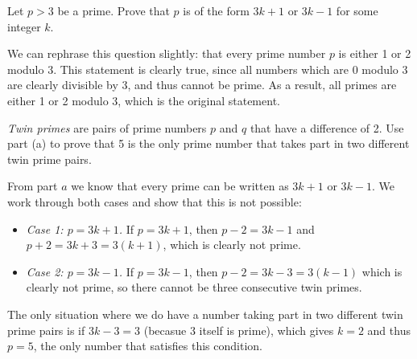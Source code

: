 \documentclass[11pt]{article}
\begin{document}

\begin{Parts}

\Part
Let $p > 3$ be a prime. Prove that $p$ is of the form $3k + 1$ or $3k-1$ for some integer $k$.

\begin{solution} 
    We can rephrase this question slightly: that every prime number $p$ is either 1 or 2 modulo 3. This statement is clearly true, since all numbers which are $0$ modulo 3 are clearly divisible by 3, and thus cannot be prime. As a result, all primes are either 1 or 2 modulo 3, which is the original statement.
\end{solution} 

\Part
\textit{Twin primes} are pairs of prime numbers $p$ and $q$ that have a difference of 2. Use part (a) to prove that 5 is the only prime number that takes part in two different twin prime pairs.

\begin{solution}
   From part $a$ we know that every prime can be written as $3k + 1$ or $3k - 1$. We work through both cases and show that this is not possible:

   \begin{itemize}
        \item \textit{Case 1: $p = 3k + 1$.} If $p = 3k + 1$, then $p - 2 = 3k - 1$ and $p + 2 = 3k+3 = 3(k+1)$, which is clearly not prime.
        \item \textit{Case 2: $p = 3k-1$.} If $p = 3k-1$, then $p - 2 = 3k - 3 = 3(k-1)$ which is clearly not prime, so there cannot be three consecutive twin primes.
   \end{itemize}

   The only situation where we do have a number taking part in two different twin prime pairs is if $3k - 3 = 3$ (becasue 3 itself is prime), which gives $k = 2$ and thus $p = 5$, the only number that satisfies this condition.
\end{solution}

\end{Parts}
\end{document}
